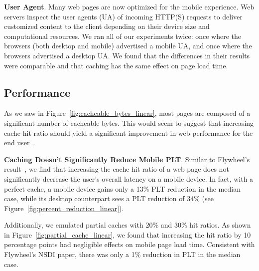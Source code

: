 \textbf{User Agent}. Many web pages are now optimized for the mobile experience. Web servers inspect the user agents (UA) of incoming HTTP(S) requests to deliver customized content to the client depending on their device size and computational resources. We ran all of our experiments twice: once where the browsers (both desktop and mobile) advertised a mobile UA, and once where the browsers advertised a desktop UA. We found that the differences in their results were comparable and that caching has the same effect on page load time. 

\subsection{Performance}
As we saw in Figure~\ref{fig:cacheable_bytes_linear}, most pages are composed of a significant number of cacheable bytes. This would seem to suggest that increasing cache hit ratio should yield a significant improvement in web performance for the end user~\cite{kroeger1997exploring}.

\textbf{Caching Doesn't Significantly Reduce Mobile PLT}.
Similar to Flywheel's result~\cite{flywheel}, we find that increasing the cache hit ratio of a web page does not significantly decrease the user's overall latency on a mobile device.
In fact, with a perfect cache, a mobile device gains only a 13\% PLT reduction in the median case, while its desktop counterpart sees a  PLT reduction of 34\% (see Figure~\ref{fig:percent_reduction_linear}).

Additionally, we emulated partial caches with 20\% and 30\% hit ratios. As shown in Figure~\ref{fig:partial_cache_linear}, we found that increasing the hit ratio by 10 percentage points had negligible effects on mobile page load time. Consistent with Flywheel's NSDI paper, there was only a 1\% reduction in PLT in the median case.

